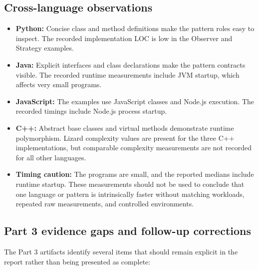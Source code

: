 \documentclass[11pt,a4paper]{article}
\begin{document}
\subsection{Cross-language observations}

\begin{itemize}[leftmargin=*]
    \item \textbf{Python:} Concise class and method definitions make the pattern roles easy to inspect. The recorded implementation LOC is low in the Observer and Strategy examples.
    \item \textbf{Java:} Explicit interfaces and class declarations make the pattern contracts visible. The recorded runtime measurements include JVM startup, which affects very small programs.
    \item \textbf{JavaScript:} The examples use JavaScript classes and Node.js execution. The recorded timings include Node.js process startup.
    \item \textbf{C++:} Abstract base classes and virtual methods demonstrate runtime polymorphism. Lizard complexity values are present for the three C++ implementations, but comparable complexity measurements are not recorded for all other languages.
    \item \textbf{Timing caution:} The programs are small, and the reported medians include runtime startup. These measurements should not be used to conclude that one language or pattern is intrinsically faster without matching workloads, repeated raw measurements, and controlled environments.
\end{itemize}

\subsection{Part 3 evidence gaps and follow-up corrections}

The Part 3 artifacts identify several items that should remain explicit in the report rather than being presented as complete:
\end{document}
